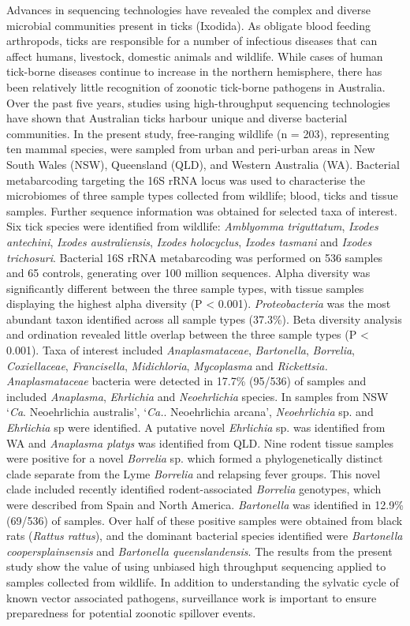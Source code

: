 \documentclass[a4paper, nobind]{templates/ociamthesis}
\begin{document}
Advances in sequencing technologies have revealed the complex and diverse microbial communities present in ticks (Ixodida).
As obligate blood feeding arthropods, ticks are responsible for a number of infectious diseases that can affect humans, livestock, domestic animals and wildlife.
While cases of human tick-borne diseases continue to increase in the northern hemisphere, there has been relatively little recognition of zoonotic tick-borne pathogens in Australia.
Over the past five years, studies using high-throughput sequencing technologies have shown that Australian ticks harbour unique and diverse bacterial communities.
In the present study, free-ranging wildlife (n = 203), representing ten mammal species, were sampled from urban and peri-urban areas in New South Wales (NSW), Queensland (QLD), and Western Australia (WA).
Bacterial metabarcoding targeting the 16S rRNA locus was used to characterise the microbiomes of three sample types collected from wildlife; blood, ticks and tissue samples.
Further sequence information was obtained for selected taxa of interest. Six tick species were identified from wildlife: \emph{Amblyomma triguttatum}, \emph{Ixodes antechini}, \emph{Ixodes australiensis}, \emph{Ixodes holocyclus}, \emph{Ixodes tasmani} and \emph{Ixodes trichosuri}.
Bacterial 16S rRNA metabarcoding was performed on 536 samples and 65 controls, generating over 100 million sequences.
Alpha diversity was significantly different between the three sample types, with tissue samples displaying the highest alpha diversity (P \textless{} 0.001).
\emph{Proteobacteria} was the most abundant taxon identified across all sample types (37.3\%).
Beta diversity analysis and ordination revealed little overlap between the three sample types (P \textless{} 0.001).
Taxa of interest included \emph{Anaplasmataceae}, \emph{Bartonella}, \emph{Borrelia}, \emph{Coxiellaceae}, \emph{Francisella}, \emph{Midichloria}, \emph{Mycoplasma} and \emph{Rickettsia.} \emph{Anaplasmataceae} bacteria were detected in 17.7\% (95/536) of samples and included \emph{Anaplasma}, \emph{Ehrlichia} and \emph{Neoehrlichia} species.
In samples from NSW `\emph{Ca}. Neoehrlichia australis', `\emph{Ca.}. Neoehrlichia arcana', \emph{Neoehrlichia} sp. and \emph{Ehrlichia} sp were identified.
A putative novel \emph{Ehrlichia} sp. was identified from WA and \emph{Anaplasma platys} was identified from QLD.
Nine rodent tissue samples were positive for a novel \emph{Borrelia} sp. which formed a phylogenetically distinct clade separate from the Lyme \emph{Borrelia} and relapsing fever groups.
This novel clade included recently identified rodent-associated \emph{Borrelia} genotypes, which were described from Spain and North America.
\emph{Bartonella} was identified in 12.9\% (69/536) of samples.
Over half of these positive samples were obtained from black rats (\emph{Rattus rattus}), and the dominant bacterial species identified were \emph{Bartonella coopersplainsensis} and \emph{Bartonella queenslandensis}.
The results from the present study show the value of using unbiased high throughput sequencing applied to samples collected from wildlife.
In addition to understanding the sylvatic cycle of known vector associated pathogens, surveillance work is important to ensure preparedness for potential zoonotic spillover events.
\end{document}
